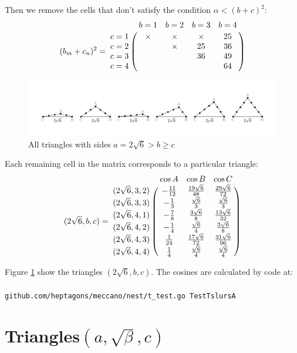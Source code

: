 \documentclass[11pt]{article}
\begin{document}
Then we remove the cells that don't satisfy the condition $\alpha < (b+c)^2$:
\begin {equation}\label{E:3}
(b_m + c_n)^2 =\bordermatrix{~ & b=1 & b=2 & b=3 & b=4 \cr
c=1 & \times & \times & \times & 25 \cr    
c=2 & & \times & 25 & 36 \cr    
c=3 & & & 36 & 49 \cr    
c=4 & & & & 64 \cr}
\end {equation}

\begin{figure}[htp]
\centering
\includegraphics[scale=0.9]{tslurA}
\caption{All triangles with sides $a = 2\sqrt{6} > b \ge c$}
\label{tslurA}
\end{figure}
    
Each remaining cell in the matrix corresponds to a particular triangle:
\begin {equation}\label{E:4}
(2\sqrt{6},b,c) =\bordermatrix{~ & \cos{A} & \cos{B} & \cos{C} \cr
(2\sqrt{6},3,2) & -\frac{11}{12} & \frac{19\sqrt{6}}{48} & \frac{29\sqrt{6}}{72} \cr
(2\sqrt{6},3,3) & -\frac{1}{3}   & \frac{\sqrt{6}}{3}    & \frac{\sqrt{6}}{3}    \cr
(2\sqrt{6},4,1) & -\frac{7}{8}   & \frac{3\sqrt{6}}{8}   & \frac{13\sqrt{6}}{32} \cr
(2\sqrt{6},4,2) & -\frac{1}{4}   & \frac{\sqrt{6}}{4}    & \frac{3\sqrt{6}}{8}   \cr
(2\sqrt{6},4,3) &  \frac{1}{24}  & \frac{17\sqrt{6}}{72} & \frac{31\sqrt{6}}{96} \cr
(2\sqrt{6},4,4) &  \frac{1}{4}   & \frac{\sqrt{6}}{4}    & \frac{\sqrt{6}}{4}    \cr}
\end{equation}

Figure \ref{tslurA} show the triangles $(2\sqrt{6},b,c)$. The cosines are calculated by code at:
\\\\
\texttt{github.com/heptagons/meccano/nest/t\_test.go TestTslursA}

\section{Triangles$(a,\sqrt{\beta},c)$}
\end{document}
